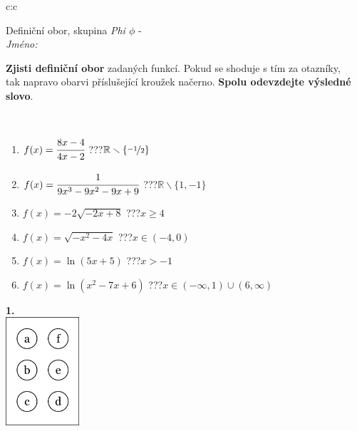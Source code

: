 \documentclass[10pt]{report}
\begin{document}
\begin{tabular}{c:c}
\begin{minipage}[c][104.5mm][t]{0.5\linewidth}
\begin{center}
\vspace{7mm}
{\huge Definiční obor, skupina \textit{Phi $\phi$} -}\\[5mm]
\textit{Jméno:}\phantom{xxxxxxxxxxxxxxxxxxxxxxxxxxxxxxxxxxxxxxxxxxxxxxxxxxxxxxxxxxxxxxxxx}\\[5mm]
\begin{minipage}{0.95\linewidth}
\begin{center}
\textbf{Zjisti definiční obor} zadaných funkcí. Pokud se shoduje s tím za otazníky,\\tak napravo obarvi příslušející kroužek načerno. \textbf{Spolu odevzdejte výsledné slovo}.
\end{center}
\end{minipage}
\\[1mm]
\begin{minipage}{0.79\linewidth}
\begin{center}
\begin{varwidth}{\linewidth}
\begin{enumerate}
\normalsizerrr
\item $f(x)=\cfrac{8x-4}{4x-2}$\quad \dotfill\; ???\;\dotfill \quad $\mathbb{R}\smallsetminus\{\nicefrac{-1}{2}\}$
\item $f(x)=\cfrac{1}{9x^3-9x^2-9x+9}$\quad \dotfill\; ???\;\dotfill \quad $\mathbb{R}\smallsetminus\{1,-1\}$
\item $f(x)=-2\sqrt{-2x+8}$\quad \dotfill\; ???\;\dotfill \quad $x\geq4$
\item $f(x)=\sqrt{-x^2-4x}$\quad \dotfill\; ???\;\dotfill \quad $x\in(-4 , 0)$
\item $f(x)=\ln{(5x+5)}$\quad \dotfill\; ???\;\dotfill \quad $x>-1$
\item $f(x)=\ln{(x^2-7x+6)}$\quad \dotfill\; ???\;\dotfill \quad $x\in(-\infty , 1)\cup(6 , \infty)$
\end{enumerate}
\end{varwidth}
\end{center}
\end{minipage}
\begin{minipage}{0.20\linewidth}
\begin{center}
{\Huge\bfseries 1.} \\[2mm]
\includegraphics[height=40mm]{../images/braille.png}

\end{center}
\end{minipage}
\end{center}
\end{minipage}
\end{tabular}
\end{document}
